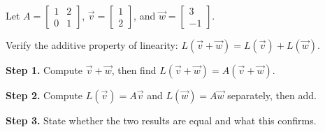 \documentclass[10pt]{article}
\begin{document}
\vspace{0.1in}

\begin{tcolorbox}[colback=white, colframe=black!40,
    title=\textbf{Tier E --- Extend},
    fonttitle=\bfseries, arc=2mm, left=3mm, right=3mm, top=2mm, bottom=2mm]
\small
Let $A = \begin{bmatrix}1 & 2 \\ 0 & 1\end{bmatrix}$,
$\vec{v} = \begin{bmatrix}1\\2\end{bmatrix}$, and $\vec{w} = \begin{bmatrix}3\\-1\end{bmatrix}$.

Verify the additive property of linearity: $L(\vec{v}+\vec{w}) = L(\vec{v}) + L(\vec{w})$.

\vspace{0.08in}
\textbf{Step 1.} Compute $\vec{v}+\vec{w}$, then find $L(\vec{v}+\vec{w}) = A(\vec{v}+\vec{w})$.


\textbf{Step 2.} Compute $L(\vec{v}) = A\vec{v}$ and $L(\vec{w}) = A\vec{w}$ separately,
then add.


\textbf{Step 3.} State whether the two results are equal and what this confirms.

\end{tcolorbox}
\end{document}
